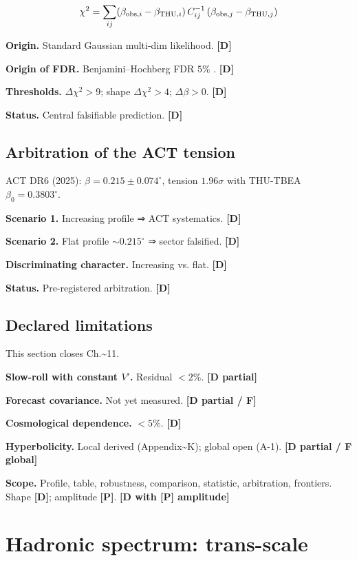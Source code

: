 ﻿\documentclass[11pt,letterpaper]{article}
\begin{document}
\begin{equation*}
  \resizebox{\ifdim\width>\linewidth \linewidth\else\width\fi}{!}{$\displaystyle \chi^2 = \sum_{ij} (\beta_{\text{obs},i} - \beta_{\text{THU},i})\,C_{ij}^{-1}\,(\beta_{\text{obs},j} - \beta_{\text{THU},j})$}
\end{equation*}

\textbf{Origin.} Standard Gaussian multi-dim likelihood. \textbf{[D]}

\textbf{Origin of FDR.} Benjamini--Hochberg FDR $5\%$ \cite{BenjaminiHochberg1995}. \textbf{[D]}

\textbf{Thresholds.} $\Delta\chi^2 > 9$; shape $\Delta\chi^2 > 4$; $\Delta\beta > 0$. \textbf{[D]}

\textbf{Status.} Central falsifiable prediction. \textbf{[D]}
\subsection{Arbitration of the ACT tension}
ACT DR6 (2025): $\beta = 0{.}215 \pm 0{.}074^\circ$, tension $1{.}96\sigma$ with THU-TBEA $\beta_0 = 0{.}3803^\circ$.

\textbf{Scenario 1.} Increasing profile ⇒ ACT systematics. \textbf{[D]}

\textbf{Scenario 2.} Flat profile $\sim 0{.}215^\circ$ ⇒ sector falsified. \textbf{[D]}

\textbf{Discriminating character.} Increasing vs. flat. \textbf{[D]}

\textbf{Status.} Pre-registered arbitration. \textbf{[D]}
\subsection{Declared limitations}
This section closes Ch.\textasciitilde{}11.

\textbf{Slow-roll with constant $V'$.} Residual $< 2\%$. \textbf{[D partial]}

\textbf{Forecast covariance.} Not yet measured. \textbf{[D partial / F]}

\textbf{Cosmological dependence.} $< 5\%$. \textbf{[D]}

\textbf{Hyperbolicity.} Local derived (Appendix\textasciitilde{}K); global open (A-1). \textbf{[D partial / F global]}

\textbf{Scope.} Profile, table, robustness, comparison, statistic, arbitration, frontiers. Shape \textbf{[D]}; amplitude \textbf{[P]}. \textbf{[D with [P] amplitude]}

\section{Hadronic spectrum: trans-scale}
\end{document}
